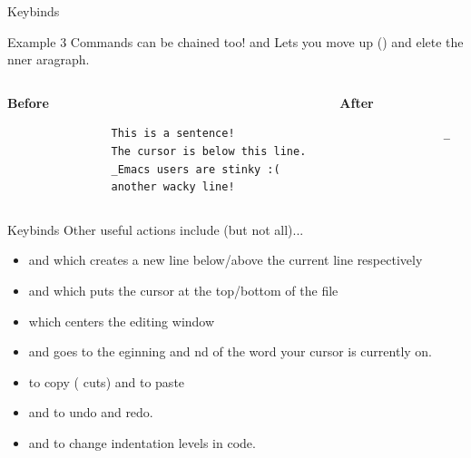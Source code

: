 \documentclass{beamer}
\begin{document}
\begin{frame}[fragile]{Keybinds}
	\begin{exampleblock}{Example 3}
		Commands can be chained too!
		 and  Lets you move  up ()
		and elete the nner
		aragraph.\footnotemark
		\pause

		\bigskip

		\begin{columns}
			\begin{column}{0.5\textwidth}
				\textbf{Before}
				\begin{verbatim}
				This is a sentence!
				The cursor is below this line.
				_Emacs users are stinky :(
				another wacky line!
				\end{verbatim}
			\end{column}
			\begin{column}{0.5\textwidth}
				\textbf{After}
				\begin{verbatim}
				_



				\end{verbatim}
			\end{column}
		\end{columns}
	\end{exampleblock}

\end{frame}

\begin{frame}{Keybinds}
	Other useful actions include (but not all)...
	\pause

	\begin{itemize}
		\item {} and  which creates a new line below/above
			the current line respectively

		\item {} and  which puts the cursor at the
			top/bottom of the file

		\item {} which centers the editing window

		\item {} and  goes to the eginning and
			nd of the word your cursor is currently on.

		\item {} to copy ( cuts) and  to paste

		\item {} and  to undo and redo.
		\item \keys{$\langle\langle$} and \keys{$\rangle\rangle$} to change indentation levels in
			code.
	\end{itemize}
\end{frame}
\end{document}
